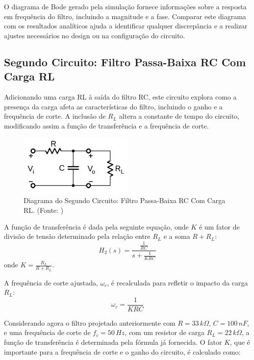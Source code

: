 \documentclass[
	12pt,				%
	openright,			%
	twoside,			%
	a4paper,			%
	english,			%
	french,				%
	spanish,			%
	brazil,				%
	]{abntex2}
\begin{document}
O diagrama de Bode gerado pela simulação fornece informações sobre a resposta em frequência do filtro, incluindo a magnitude e a fase. Comparar este diagrama com os resultados analíticos ajuda a identificar qualquer discrepância e a realizar ajustes necessários no design ou na configuração do circuito.


\subsection{Segundo Circuito: Filtro Passa-Baixa RC Com Carga RL}

Adicionando uma carga RL à saída do filtro RC, este circuito explora como a presença da carga afeta as características do filtro, incluindo o ganho e a frequência de corte. A inclusão de \( R_L \) altera a constante de tempo do circuito, modificando assim a função de transferência e a frequência de corte.

\begin{figure}[H]
\centering
\includegraphics[width=0.5\textwidth]{imgs/second_circuit_diagram.png}
\caption{Diagrama do Segundo Circuito: Filtro Passa-Baixa RC Com Carga RL. (Fonte: \cite{ufpe2023pratica})}
\label{fig:second_circuit_analysis}
\end{figure}

A função de transferência é dada pela seguinte equação, onde \( K \) é um fator de divisão de tensão determinado pela relação entre \( R_L \) e a soma \( R + R_L \):
\begin{equation}
    H_2(s) = \frac{\frac{1}{RC}}{s + \frac{1}{KRC}}
    \label{eq:second_transfer_function}
\end{equation}
onde \( K = \frac{R_L}{R + R_L} \).

A frequência de corte ajustada, \( \omega_c \), é recalculada para refletir o impacto da carga \( R_L \):
\begin{equation}
    \omega_c = \frac{1}{KRC}
    \label{eq:cutoff_frequency_loaded}
\end{equation}


Considerando agora o filtro projetado anteriormente com \( R = 33 \, k\Omega \), \( C = 100 \, nF \), e uma frequência de corte de \( f_c = 50 \, Hz \), com um resistor de carga \( R_L = 22 \, k\Omega \), a função de transferência é determinada pela fórmula já fornecida. O fator \( K \), que é importante para a frequência de corte e o ganho do circuito, é calculado como:
\end{document}
